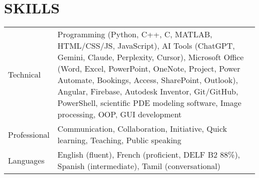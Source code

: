 \documentclass[a4paper,10pt]{article}
\begin{document}
\section{SKILLS}
\begin{tabularx}{\linewidth}{@{}l X@{}}
Technical &  \normalsize{Programming (Python, C++, C, MATLAB, HTML/CSS/JS, JavaScript), AI Tools (ChatGPT, Gemini, Claude, Perplexity, Cursor), Microsoft Office (Word, Excel, PowerPoint, OneNote, Project, Power Automate, Bookings, Access, SharePoint, Outlook), Angular, Firebase, Autodesk Inventor, Git/GitHub, PowerShell, scientific PDE modeling software, Image processing, OOP, GUI development}\\
Professional  &  \normalsize{Communication, Collaboration, Initiative, Quick learning, Teaching, Public speaking}\\  
Languages & \normalsize{English (fluent), French (proficient, DELF B2 88\%), Spanish (intermediate), Tamil (conversational)}\\
\end{tabularx}


% 
\end{document}

